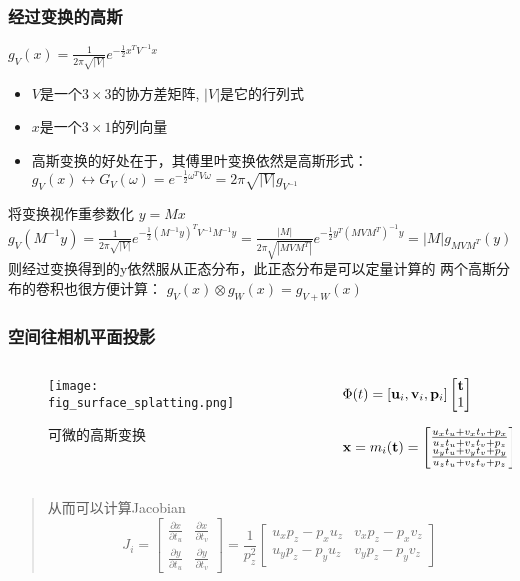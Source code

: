 \begin{frame}
    \frametitle{经过变换的高斯}
    $g_V(x)=\frac{1}{2\pi \sqrt{|V|}}e^{-\frac{1}{2}x^TV^{-1}x}$
    \begin{itemize}
        \item $V$是一个$3\times 3$的协方差矩阵, $|V|$是它的行列式
        \item $x$是一个$3\times 1$的列向量
        \item 高斯变换的好处在于，其傅里叶变换依然是高斯形式：$g_V(x)\leftrightarrow G_V(\omega)=e^{-\frac{1}{2}\omega^TV\omega}=2\pi \sqrt{|V|}g_{V^{-1}}$
    \end{itemize}
    将变换视作重参数化 $y = Mx$
    $g_V(M^{-1}y)=\frac{1}{2\pi\sqrt{|V|}}e^{-\frac{1}{2}(M^{-1}y)^TV^{-1}M^{-1}y}=\frac{|M|}{2\pi\sqrt{|MVM^T|}}e^{-\frac{1}{2}y^T(MVM^T)^{-1}y}=|M|g_{MVM^T}(y)$
    则经过变换得到的y依然服从正态分布，此正态分布是可以定量计算的
    两个高斯分布的卷积也很方便计算： $g_V(x)\otimes g_W(x)=g_{V+W}(x)$
\end{frame}

\begin{frame}
    \frametitle{空间往相机平面投影}

    \begin{columns}[c]
        \begin{column}{0.58\textwidth} %
            \begin{figure}[H]
                \centering
                \texttt{[image: fig\_surface\_splatting.png]}
                \caption{可微的高斯变换}
                \label{fig:diff_gaussian_splatting}
            \end{figure}
        \end{column}
        \begin{column}{0.4\textwidth} %
            $\Phi(t)=[\bold{u}_i,\bold{v}_i,\bold{p}_i]\left[\begin{matrix} \bold{t} \\ 1 \end{matrix}\right]$

            $\bold{x}=m_i(\bold{t})=\left[\begin{matrix} \frac{u_xt_u+v_xt_v+p_x}{u_zt_u+v_zt_v+p_z} \\  \frac{u_yt_u+v_yt_v+p_y}{u_zt_u+v_zt_v+p_z} \end{matrix}\right]$
        \end{column}
    \end{columns}
    \begin{quote}
        从而可以计算Jacobian 
        $$J_i=\left[\begin{matrix}\frac{\partial x}{\partial t_u} & \frac{\partial x}{\partial t_v} \\ \frac{\partial y}{\partial t_u} & \frac{\partial y}{\partial t_v} \end{matrix}\right]=\frac{1}{p_z^2}\left[\begin{matrix}u_xp_z-p_xu_z & v_xp_z - p_xv_z\\ u_yp_z-p_yu_z & v_yp_z-p_yv_z \end{matrix}\right]$$
    \end{quote}
\end{frame}

